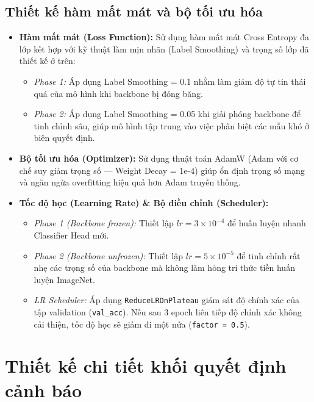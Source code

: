 \documentclass[../DoAn.tex]{subfiles}
\begin{document}
\subsection{Thiết kế hàm mất mát và bộ tối ưu hóa}
\begin{itemize}
    \item \textbf{Hàm mất mát (Loss Function):} Sử dụng hàm mất mát Cross Entropy đa lớp kết hợp với kỹ thuật làm mịn nhãn (Label Smoothing) và trọng số lớp đã thiết kế ở trên:
    \begin{itemize}
        \item \textit{Phase 1:} Áp dụng Label Smoothing = 0.1 nhằm làm giảm độ tự tin thái quá của mô hình khi backbone bị đóng băng.
        \item \textit{Phase 2:} Áp dụng Label Smoothing = 0.05 khi giải phóng backbone để tinh chỉnh sâu, giúp mô hình tập trung vào việc phân biệt các mẫu khó ở biên quyết định.
    \end{itemize}
    \item \textbf{Bộ tối ưu hóa (Optimizer):} Sử dụng thuật toán AdamW (Adam với cơ chế suy giảm trọng số --- Weight Decay = 1e-4) giúp ổn định trọng số mạng và ngăn ngừa overfitting hiệu quả hơn Adam truyền thống.
    \item \textbf{Tốc độ học (Learning Rate) \& Bộ điều chỉnh (Scheduler):}
    \begin{itemize}
        \item \textit{Phase 1 (Backbone frozen):} Thiết lập $lr = 3 \times 10^{-4}$ để huấn luyện nhanh Classifier Head mới.
        \item \textit{Phase 2 (Backbone unfrozen):} Thiết lập $lr = 5 \times 10^{-5}$ để tinh chỉnh rất nhẹ các trọng số của backbone mà không làm hỏng tri thức tiền huấn luyện ImageNet.
        \item \textit{LR Scheduler:} Áp dụng \texttt{ReduceLROnPlateau} giám sát độ chính xác của tập validation (\texttt{val\_acc}). Nếu sau 3 epoch liên tiếp độ chính xác không cải thiện, tốc độ học sẽ giảm đi một nửa (\texttt{factor = 0.5}).
    \end{itemize}
\end{itemize}

\section{Thiết kế chi tiết khối quyết định cảnh báo}
\label{section:4.5}
\end{document}
